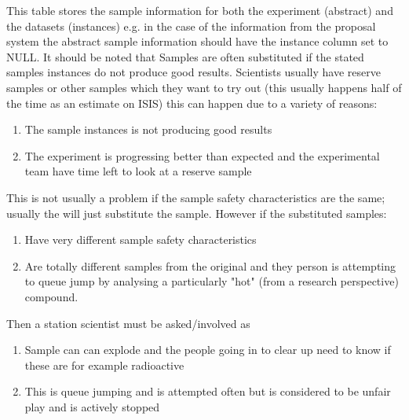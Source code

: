 \documentclass{report}
\begin{document}
This table stores the sample information for both the experiment (abstract) and the datasets (instances) e.g. in the case of the information from the proposal system the abstract sample information should have the instance column set to NULL.  It should be noted that Samples are often substituted if the stated samples instances do not produce good results. Scientists usually have reserve samples or other samples which they want to try out (this usually happens half of the time as an estimate on ISIS) this can happen due to a variety of reasons:	\begin{enumerate} \item The sample instances is not producing good results \item The experiment is progressing better than expected and the experimental team have time left to look at a reserve sample \end{enumerate}  This is not usually a problem if the sample safety characteristics are the same; usually the will just substitute the sample.   However if the substituted samples:  \begin{enumerate} \item Have very different sample safety characteristics  \item Are totally different samples from the original and they person is attempting to queue jump by analysing a particularly "hot" (from a research perspective) compound. \end{enumerate}  Then a station scientist must be asked/involved as  \begin{enumerate} \item Sample can can explode and the people going in to clear up need to know if these are for example radioactive \item This is queue jumping and is attempted often but is considered to be unfair play and is actively stopped \end{enumerate}\\
\end{document}
